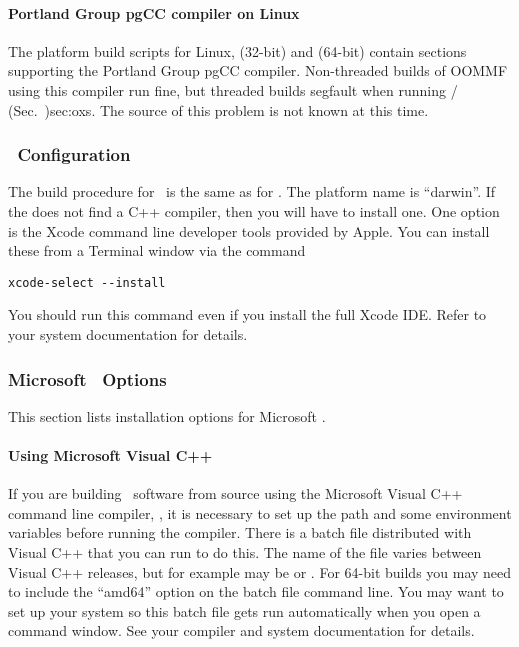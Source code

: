 \paragraph{Portland Group pgCC compiler on Linux}
The platform build scripts for Linux,
 (32-bit) and
 (64-bit) contain sections
supporting the Portland Group pgCC compiler.  Non-threaded builds of
OOMMF using this compiler run fine, but threaded builds segfault when
running  {/
 (Sec.~}{)}{sec:oxs}.  The source of this problem is not known at this
time.


\subsubsection{\MacOSX\ Configuration}\label{sec:install.macosx}
The build procedure for \MacOSX\ is the same as for \Unix.  The
platform name is ``darwin''.  If the  does not find a C++ compiler,
then you will have to install one.  One option is the Xcode command line
developer tools provided by Apple.  You can install these from a
Terminal window via the command
\begin{verbatim}
xcode-select --install
\end{verbatim}
You should run this command even if you install the full Xcode IDE.
Refer to your system documentation for details.

\subsubsection{Microsoft \Windows\ Options}\label{sec:install.windows}

This section lists installation options for Microsoft \Windows.

\paragraph{Using Microsoft Visual C++}
If you are building \OOMMF\ software from source using the Microsoft
Visual C++ command line compiler, , it is necessary to set up
the path and some environment variables before running the compiler.
There is a batch file distributed with Visual C++ that you can run to do
this.  The name of the file varies between Visual C++ releases, but for
example may be  or .  For 64-bit builds
you may need to include the ``amd64'' option on the batch file command
line.  You may want to set up your system so this batch file gets run
automatically when you open a command window.  See your compiler and
system documentation for details.

